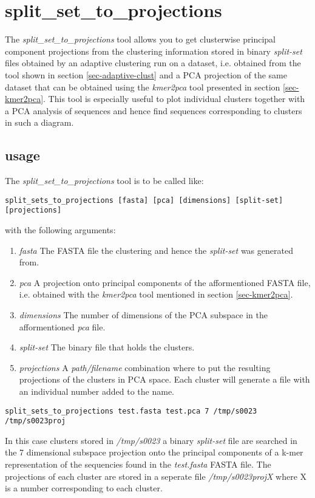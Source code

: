 \section{split\_set\_to\_projections} \label{sec-ssproj}

The \emph{split\_set\_to\_projections} tool allows you to get clusterwise
principal component projections from the clustering information stored in
binary \emph{split-set} files obtained by an adaptive clustering run
on a dataset, i.e. obtained from the tool shown in section
\ref{sec-adaptive-clust} and a PCA projection of the same dataset that
can be obtained using the \emph{kmer2pca} tool presented in section
\ref{sec-kmer2pca}.
This tool is especially useful to plot individual clusters together
with a PCA analysis of sequences and hence find sequences
corresponding to clusters in such a diagram. 

\subsection{usage}

The \emph{split\_set\_to\_projections} tool is to be called like:

\begin{lstlisting}
split_sets_to_projections [fasta] [pca] [dimensions] [split-set] [projections]
\end{lstlisting}
with the following arguments:
\begin{enumerate}
  \item \emph{fasta} The FASTA file the clustering and hence the
    \emph{split-set} was generated from.
  \item \emph{pca} A projection onto principal components of the
    afformentioned FASTA file, i.e. obtained with the \emph{kmer2pca}
    tool mentioned in section \ref{sec-kmer2pca}.
  \item \emph{dimensions} The number of dimensions of the PCA subspace in the
    afformentioned \emph{pca} file.
  \item \emph{split-set} The binary file that holds the clusters.
  \item \emph{projections} A \emph{path/filename} combination where to put
    the resulting projections of the clusters in PCA space. Each
    cluster will generate a file with an individual number added to
    the name.
\end{enumerate}

\begin{lstlisting}
split_sets_to_projections test.fasta test.pca 7 /tmp/s0023 /tmp/s0023proj
\end{lstlisting}
In this case clusters stored in \emph{/tmp/s0023} a binary
\emph{split-set} file are searched in the 7 dimensional subspace
projection onto the principal components of a k-mer representation of
the sequencies found in the \emph{test.fasta} FASTA file. The
projections of each cluster are stored in a seperate file
\emph{/tmp/s0023projX} where X is a number corresponding to each
cluster. 

